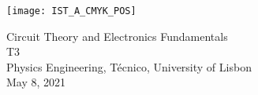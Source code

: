 
\thispagestyle {empty}

\texttt{[image: IST\_A\_CMYK\_POS]}

\begin{center}
%
\vspace{1.0cm}

\vspace{1cm}
{\FontLb Circuit Theory and Electronics Fundamentals} \\ %
\vspace{1cm}
{\FontLb T3} \\
\vspace{1cm}
{\FontSn Physics Engineering, Técnico, University of Lisbon} \\ %
\vspace{1cm}
{\FontSn May 8, 2021} \\ %
%
\end{center}

